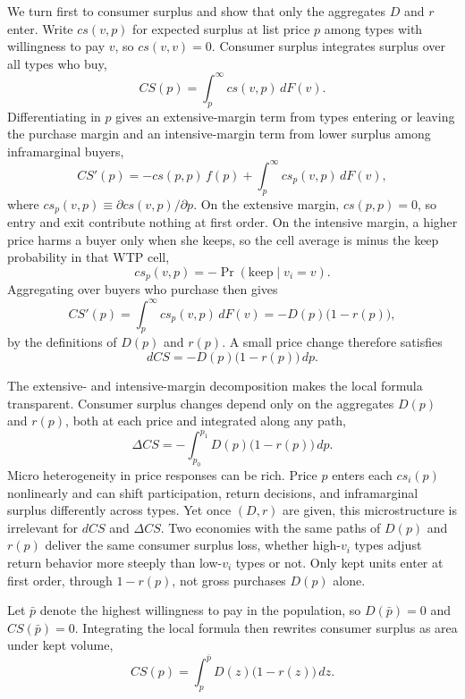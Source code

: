 \documentclass[11pt]{article}
\begin{document}
We turn first to consumer surplus and show that only the aggregates $D$ and
$r$ enter.  Write $cs(v,p)$ for expected surplus at list price $p$ among types
with willingness to pay $v$, so $cs(v,v)=0$.  Consumer surplus integrates surplus
over all types who buy,
\begin{equation}
  CS(p)=\int_p^\infty cs(v,p)\,dF(v).
\end{equation}
Differentiating in $p$ gives an extensive-margin term from types entering or
leaving the purchase margin and an intensive-margin term from lower surplus
among inframarginal buyers,
\[
  CS'(p)
  = -cs(p,p)\,f(p)+\int_p^\infty cs_p(v,p)\,dF(v),
\]
where $cs_p(v,p)\equiv \partial cs(v,p)/\partial p$.  On the extensive margin,
$cs(p,p)=0$, so entry and exit contribute nothing at first order.  On the intensive margin, a higher price harms a buyer only when she keeps, so the cell average is minus the keep probability in that WTP cell,
\[
  cs_p(v,p)
  =
  -\Pr(\text{keep}\mid v_i=v).
\]
Aggregating over buyers who purchase then gives
\[
  CS'(p)=\int_p^\infty cs_p(v,p)\,dF(v)
  = -D(p)\bigl(1-r(p)\bigr),
\]
by the definitions of $D(p)$ and $r(p)$.  A small price change therefore satisfies
\begin{equation}
  dCS = -D(p)\bigl(1-r(p)\bigr)\,dp.
  \label{eq:dCS}
\end{equation}

The extensive- and intensive-margin decomposition makes the local formula
transparent.  Consumer surplus changes depend only on the aggregates $D(p)$ and
$r(p)$, both at each price and integrated along any path,
\[
  \Delta CS = -\int_{p_0}^{p_1} D(p)\bigl(1-r(p)\bigr)\,dp.
\]
Micro heterogeneity in price responses can be rich.  Price $p$ enters each
$cs_i(p)$ nonlinearly and can shift participation, return decisions, and
inframarginal surplus differently across types.  Yet once $(D,r)$ are given, this
microstructure is irrelevant for $dCS$ and $\Delta CS$.  Two economies with
the same paths of $D(p)$ and $r(p)$ deliver the same consumer surplus loss,
whether high-$v_i$ types adjust return behavior more steeply than low-$v_i$
types or not.  Only kept units enter at first order, through $1-r(p)$, not
gross purchases $D(p)$ alone.

Let $\bar{p}$ denote the highest willingness to pay in the population, so
$D(\bar{p})=0$ and $CS(\bar{p})=0$.  Integrating the local formula then
rewrites consumer surplus as area under kept volume,
\begin{equation}
  CS(p)=\int_p^{\bar{p}} D(z)\bigl(1-r(z)\bigr)\,dz.
\end{equation}
\end{document}
